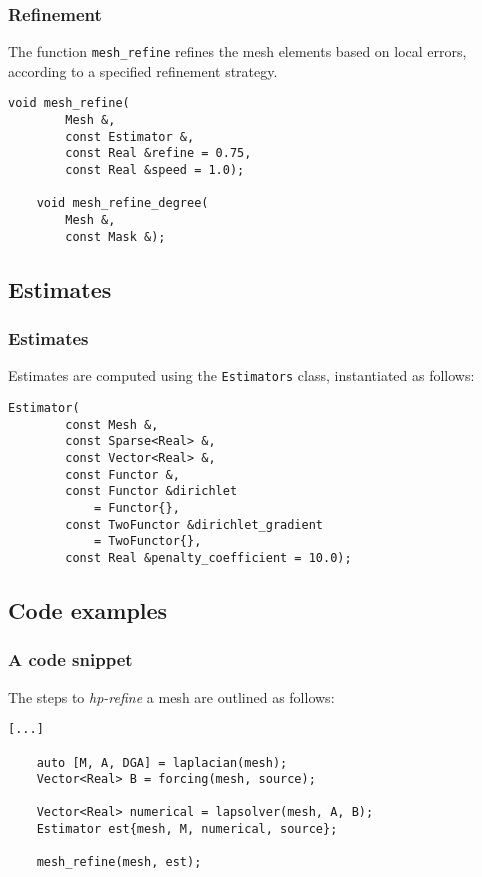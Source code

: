 \begin{frame}[fragile]
    \frametitle{Refinement}

    The function \lstinline{mesh_refine} refines the mesh elements based on local errors, according to a specified refinement strategy.

    \begin{lstlisting}[style=cpp]
    void mesh_refine(
        Mesh &, 
        const Estimator &, 
        const Real &refine = 0.75, 
        const Real &speed = 1.0);

    void mesh_refine_degree(
        Mesh &, 
        const Mask &);
    \end{lstlisting}

\end{frame}

\subsection{Estimates}

\begin{frame}[fragile]
    \frametitle{Estimates}

    Estimates are computed using the \lstinline{Estimators} class, instantiated as follows:

    \begin{lstlisting}[style=cpp]
    Estimator(
        const Mesh &, 
        const Sparse<Real> &, 
        const Vector<Real> &, 
        const Functor &, 
        const Functor &dirichlet
            = Functor{}, 
        const TwoFunctor &dirichlet_gradient
            = TwoFunctor{}, 
        const Real &penalty_coefficient = 10.0);
    \end{lstlisting}

\end{frame}

\subsection{Code examples}

\begin{frame}[fragile]
    \frametitle{A code snippet}

    The steps to \textit{hp-refine} a mesh are outlined as follows:

    \begin{lstlisting}[style=cpp]
    [...]

    auto [M, A, DGA] = laplacian(mesh);
    Vector<Real> B = forcing(mesh, source);

    Vector<Real> numerical = lapsolver(mesh, A, B);
    Estimator est{mesh, M, numerical, source};

    mesh_refine(mesh, est);
    \end{lstlisting}

\end{frame}